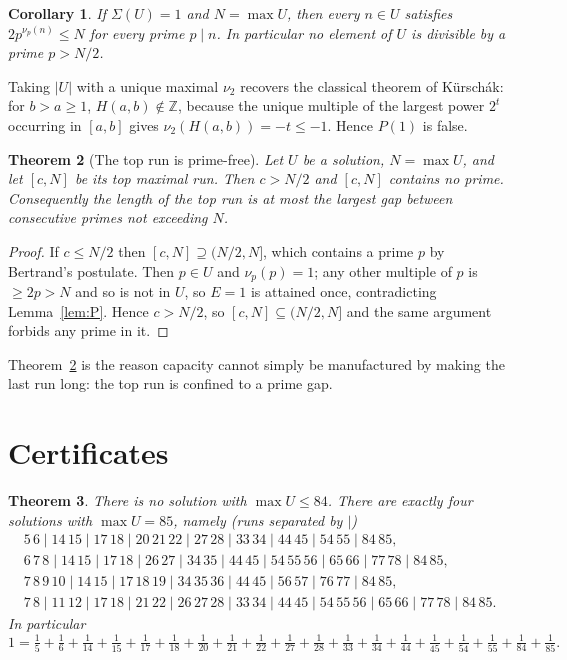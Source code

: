 \documentclass[11pt]{article}
\newtheorem{theorem}{Theorem}
\newtheorem{corollary}[theorem]{Corollary}
\theoremstyle{definition}
\begin{document}
\begin{corollary}\label{cor:powersmooth}
If $\Sigma(U)=1$ and $N=\max U$, then every $n\in U$ satisfies $2p^{\nu_p(n)}\le N$ for every
prime $p\mid n$. In particular no element of $U$ is divisible by a prime $p>N/2$.
\end{corollary}

Taking $|U|$ with a unique maximal $\nu_2$ recovers the classical theorem of Kürschák: for
$b>a\ge1$, $H(a,b)\notin\mathbb{Z}$, because the unique multiple of the largest power $2^t$
occurring in $[a,b]$ gives $\nu_2(H(a,b))=-t\le-1$. Hence $P(1)$ is false.

\begin{theorem}[The top run is prime-free]\label{thm:toprun}
Let $U$ be a solution, $N=\max U$, and let $[c,N]$ be its top maximal run. Then $c>N/2$ and
$[c,N]$ contains no prime. Consequently the length of the top run is at most the largest gap
between consecutive primes not exceeding $N$.
\end{theorem}

\begin{proof}
If $c\le N/2$ then $[c,N]\supseteq(N/2,N]$, which contains a prime $p$ by Bertrand's
postulate. Then $p\in U$ and $\nu_p(p)=1$; any other multiple of $p$ is $\ge2p>N$ and so is
not in $U$, so $E=1$ is attained once, contradicting Lemma~\ref{lem:P}. Hence $c>N/2$, so
$[c,N]\subseteq(N/2,N]$ and the same argument forbids any prime in it.
\end{proof}

Theorem~\ref{thm:toprun} is the reason capacity cannot simply be manufactured by making the
last run long: the top run is confined to a prime gap.

\section{Certificates}

\begin{theorem}\label{thm:min}
There is no solution with $\max U\le84$. There are exactly four solutions with $\max U=85$,
namely (runs separated by $\mid$)
\[
\begin{array}{l}
5\,6\mid14\,15\mid17\,18\mid20\,21\,22\mid27\,28\mid33\,34\mid44\,45\mid54\,55\mid84\,85,\\
6\,7\,8\mid14\,15\mid17\,18\mid26\,27\mid34\,35\mid44\,45\mid54\,55\,56\mid65\,66\mid77\,78\mid84\,85,\\
7\,8\,9\,10\mid14\,15\mid17\,18\,19\mid34\,35\,36\mid44\,45\mid56\,57\mid76\,77\mid84\,85,\\
7\,8\mid11\,12\mid17\,18\mid21\,22\mid26\,27\,28\mid33\,34\mid44\,45\mid54\,55\,56\mid65\,66\mid77\,78\mid84\,85.
\end{array}
\]
In particular
\[
1=\tfrac15+\tfrac16+\tfrac1{14}+\tfrac1{15}+\tfrac1{17}+\tfrac1{18}+\tfrac1{20}+\tfrac1{21}
+\tfrac1{22}+\tfrac1{27}+\tfrac1{28}+\tfrac1{33}+\tfrac1{34}+\tfrac1{44}+\tfrac1{45}
+\tfrac1{54}+\tfrac1{55}+\tfrac1{84}+\tfrac1{85}.
\]
\end{theorem}
\end{document}
